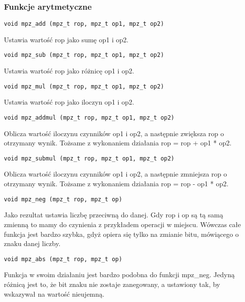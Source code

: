\documentclass[twoside,a4paper]{book}
\begin{document}
\subsubsection{Funkcje arytmetyczne}

\begin{lstlisting}
void mpz_add (mpz_t rop, mpz_t op1, mpz_t op2)
\end{lstlisting}

Ustawia wartość rop jako sumę op1 i op2.

\begin{lstlisting}
void mpz_sub (mpz_t rop, mpz_t op1, mpz_t op2)
\end{lstlisting}

Ustawia wartość rop jako różnicę op1 i op2.

\begin{lstlisting}
void mpz_mul (mpz_t rop, mpz_t op1, mpz_t op2)
\end{lstlisting}

Ustawia wartość rop jako iloczyn op1 i op2.

\begin{lstlisting}
void mpz_addmul (mpz_t rop, mpz_t op1, mpz_t op2)
\end{lstlisting}

Oblicza wartość iloczynu czynników op1 i op2, a następnie zwiększa rop o otrzymany wynik. Tożsame z wykonaniem działania rop = rop + op1 * op2.

\begin{lstlisting}
void mpz_submul (mpz_t rop, mpz_t op1, mpz_t op2)
\end{lstlisting}

Oblicza wartość iloczynu czynników op1 i op2, a następnie zmniejsza rop o otrzymany wynik. Tożsame z wykonaniem działania rop = rop - op1 * op2.

\begin{lstlisting}
void mpz_neg (mpz_t rop, mpz_t op)
\end{lstlisting}

Jako rezultat ustawia liczbę przeciwną do danej. Gdy rop i op są tą samą zmienną to mamy do czynienia z przykładem operacji w miejscu. Wówczas całe funkcja jest bardzo szybka, gdyż opiera się tylko na zmianie bitu, mówiącego o znaku danej liczby.

\begin{lstlisting}
void mpz_abs (mpz_t rop, mpz_t op)
\end{lstlisting}

Funkcja w swoim działaniu jest bardzo podobna do funkcji mpz\_neg. Jedyną różnicą jest to, że bit znaku nie zostaje zanegowany, a ustawiony tak, by wskazywał na wartość nieujemną.
\end{document}
